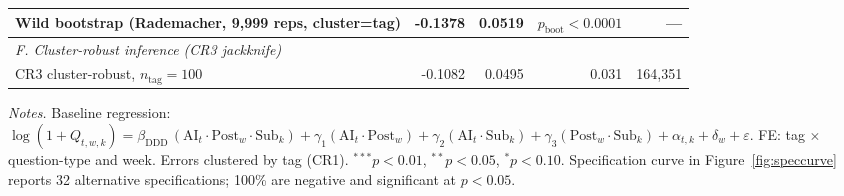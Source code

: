 \begin{table}[!htbp]
\begin{adjustbox}{max width=\textwidth}
\begin{tabular}{lrrrr}
  Wild bootstrap (Rademacher, 9{,}999 reps, cluster=tag) & -0.1378 & 0.0519 & $p_{\text{boot}}<0.0001$ & --- \\
\midrule
\multicolumn{5}{l}{\textit{F. Cluster-robust inference (CR3 jackknife)}} \\
  CR3 cluster-robust, $n_{\text{tag}}=100$ & -0.1082 & 0.0495 & 0.031 & 164,351 \\
\bottomrule
\end{tabular}
\end{adjustbox}
\begin{minipage}{0.95\textwidth}
\scriptsize
\emph{Notes.} Baseline regression: $\log(1+Q_{t,w,k}) =
\beta_{\text{DDD}}\,(\text{AI}_t\!\cdot\!\text{Post}_w\!\cdot\!\text{Sub}_k)
+ \gamma_1 (\text{AI}_t\!\cdot\!\text{Post}_w)
+ \gamma_2 (\text{AI}_t\!\cdot\!\text{Sub}_k)
+ \gamma_3 (\text{Post}_w\!\cdot\!\text{Sub}_k)
+ \alpha_{t,k} + \delta_w + \varepsilon$.
FE: tag $\times$ question-type and week. Errors clustered by tag
(CR1). $^{***}p<0.01$, $^{**}p<0.05$, $^{*}p<0.10$. Specification
curve in Figure~\ref{fig:speccurve} reports 32 alternative
specifications; 100\% are negative and significant at $p<0.05$.
\end{minipage}
\end{table}